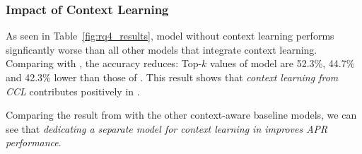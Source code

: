 %			





\subsubsection{\bf Impact of Context Learning}

As seen in Table~\ref{fig:rq4_results},  model
without context learning performs signficantly worse than all other
models that integrate context learning. Comparing with {\tool}, the
accuracy reduces: Top-$k$ values of  model are
52.3\%, 44.7\% and 42.3\% lower than those of {\tool}. This result
shows that {\em context learning from CCL} contributes positively in
{\tool}.

Comparing the result from {\tool} with the other context-aware
baseline models, we can see that {\em dedicating a separate model for
context learning in {\tool} improves APR performance}.


